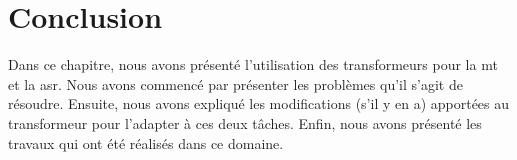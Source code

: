 \section{Conclusion}

Dans ce chapitre, nous avons présenté l'utilisation des transformeurs pour la \gls{mt} et la \gls{asr}.
Nous avons commencé par présenter les problèmes qu'il s'agit de résoudre.
Ensuite, nous avons expliqué les modifications (s'il y en a) 
apportées au transformeur pour l'adapter à ces deux tâches.
Enfin, nous avons présenté les travaux qui ont été réalisés dans ce domaine.